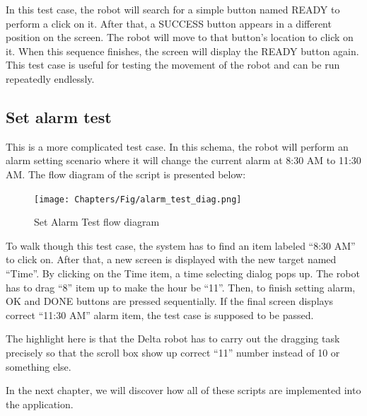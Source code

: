 In this test case, the robot will search for a simple button named READY to perform a click on it. After that, a SUCCESS button appears in a different position on the screen. The robot will move to that button's location to click on it. When this sequence finishes, the screen will display the READY button again.
This test case is useful for testing the movement of the robot and can be run repeatedly endlessly.

\subsection{Set alarm test}
This is a more complicated test case. In this schema, the robot will perform an alarm setting scenario where it will change the current alarm at 8:30 AM to 11:30 AM. The flow diagram of the script is presented below:

	\begin{figure}[H]
		\centering
		\texttt{[image: Chapters/Fig/alarm\_test\_diag.png]}
		\caption{Set Alarm Test flow diagram}
		\label{fig:alarm_test_diag}
	\end{figure}

To walk though this test case, the system has to find an item labeled ``8:30 AM'' to click on. After that, a new screen is displayed with the new target named ``Time''. By clicking on the Time item, a time selecting dialog pops up. The robot has to drag ``8'' item up to make the hour be ``11''. Then, to finish setting alarm, OK and DONE buttons are pressed sequentially. If the final screen displays correct ``11:30 AM'' alarm item, the test case is supposed to be passed.

The highlight here is that the Delta robot has to carry out the dragging task precisely so that the scroll box show up correct ``11'' number instead of 10 or something else.

In the next chapter, we will discover how all of these scripts are implemented into the application.